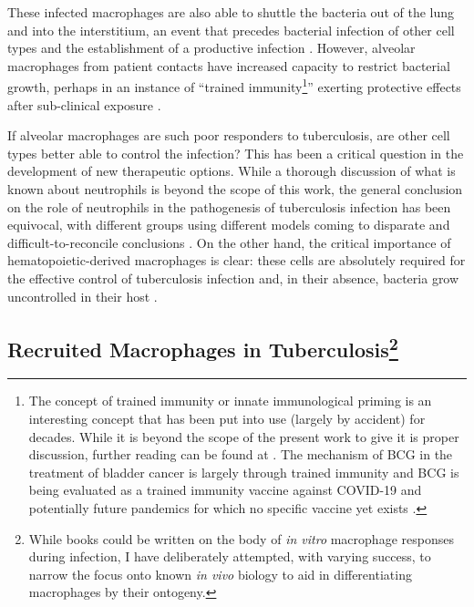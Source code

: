 These infected macrophages are also able to shuttle the bacteria out of the lung and into the interstitium, an event that precedes bacterial infection of other cell types and the establishment of a productive infection \citep{Cohen2018}. However, alveolar macrophages from patient contacts have increased capacity to restrict bacterial growth, perhaps in an instance of ``trained immunity\footnote{The concept of trained immunity or innate immunological priming is an interesting concept that has been put into use (largely by accident) for decades. While it is beyond the scope of the present work to give it is proper discussion, further reading can be found at \citep{Moorlag2020, Khan2020, Netea2020, Kaufmann2022, Katzmarski2021, Katzmarski2022, Arts2018, Trauer2021}. The mechanism of BCG in the treatment of bladder cancer is largely through trained immunity \citep{RedelmanSidi2014} and BCG is being evaluated as a trained immunity vaccine against COVID\hyp{}19 and potentially future pandemics for which no specific vaccine yet exists \citep{RedelmanSidi2020}.}'' exerting protective effects after sub\hyp{}clinical exposure \citep{Carranza2006, Divangahi2021}. 

If alveolar macrophages are such poor responders to tuberculosis, are other cell types better able to control the infection? This has been a critical question in the development of new therapeutic options. While a thorough discussion of what is known about neutrophils is beyond the scope of this work, the general conclusion on the role of neutrophils in the pathogenesis of tuberculosis infection has been equivocal, with different groups using different models coming to disparate and difficult\hyp{}to\hyp{}reconcile conclusions \citep{Fortune2007, Yang2012, Srivastava2014}. On the other hand, the critical importance of hematopoietic\hyp{}derived macrophages is clear: these cells are absolutely required for the effective control of tuberculosis infection and, in their absence, bacteria grow uncontrolled in their host \citep{Pagan2015, Matty2019, Clay2007}. 

\subsection[Recruited Macrophages in Tuberculosis]{Recruited Macrophages in Tuberculosis\footnote{While books could be written on the body of \textit{in vitro} macrophage responses during infection, I have deliberately attempted, with varying success, to narrow the focus onto known \textit{in vivo} biology to aid in differentiating macrophages by their ontogeny.}}\label{recmac}

